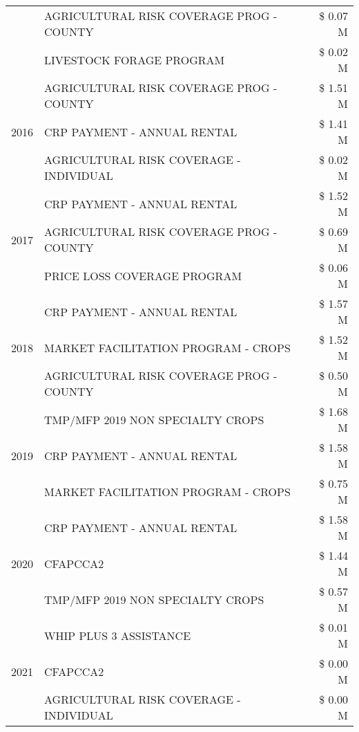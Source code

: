 \begin{tabular}{llr}
 & AGRICULTURAL RISK COVERAGE PROG - COUNTY & \$ 0.07 M \\
 & LIVESTOCK FORAGE PROGRAM & \$ 0.02 M \\
\cline{1-3}
\multirow[t]{3}{*}{2016} & AGRICULTURAL RISK COVERAGE PROG - COUNTY      & \$ 1.51 M \\
 & CRP PAYMENT - ANNUAL RENTAL                   & \$ 1.41 M \\
 & AGRICULTURAL RISK COVERAGE - INDIVIDUAL       & \$ 0.02 M \\
\cline{1-3}
\multirow[t]{3}{*}{2017} & CRP PAYMENT - ANNUAL RENTAL & \$ 1.52 M \\
 & AGRICULTURAL RISK COVERAGE PROG - COUNTY & \$ 0.69 M \\
 & PRICE LOSS COVERAGE PROGRAM & \$ 0.06 M \\
\cline{1-3}
\multirow[t]{3}{*}{2018} & CRP PAYMENT - ANNUAL RENTAL & \$ 1.57 M \\
 & MARKET FACILITATION PROGRAM - CROPS & \$ 1.52 M \\
 & AGRICULTURAL RISK COVERAGE PROG - COUNTY & \$ 0.50 M \\
\cline{1-3}
\multirow[t]{3}{*}{2019} & TMP/MFP 2019 NON SPECIALTY CROPS & \$ 1.68 M \\
 & CRP PAYMENT - ANNUAL RENTAL & \$ 1.58 M \\
 & MARKET FACILITATION PROGRAM - CROPS & \$ 0.75 M \\
\cline{1-3}
\multirow[t]{3}{*}{2020} & CRP PAYMENT - ANNUAL RENTAL & \$ 1.58 M \\
 & CFAPCCA2 & \$ 1.44 M \\
 & TMP/MFP 2019 NON SPECIALTY CROPS & \$ 0.57 M \\
\cline{1-3}
\multirow[t]{3}{*}{2021} & WHIP PLUS 3 ASSISTANCE & \$ 0.01 M \\
 & CFAPCCA2 & \$ 0.00 M \\
 & AGRICULTURAL RISK COVERAGE - INDIVIDUAL & \$ 0.00 M \\
\cline{1-3}
\bottomrule
\end{tabular}

